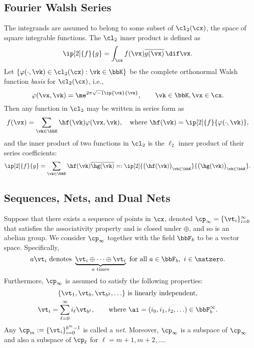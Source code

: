 \documentclass[]{elsarticle}
\theoremstyle{definition}
\begin{document}
\subsection{Fourier Walsh Series}

The integrands are assumed to belong to some subset of $\cl_2(\cx)$, the space of square integrable functions.  The $\cl_2$ inner product is defined as 
\[
\ip[2]{f}{g} = \int_{\cx} f(\vx) \overline{g(\vx)} \, \dif \vx.
\]
Let $\{\varphi(\cdot,\vk) \in \cl_2(\cx) : \vk \in \bbK\}$ be the complete orthonormal Walsh function \emph{basis} for $\cl_2(\cx)$, i.e., 
\[
\varphi(\vx,\vk)  = \me^{2 \pi \sqrt{-1} \ip{\vk}{\vx}}, \qquad \vk \in \bbK, \vx \in \cx.
\]
Then any function in $\cl_2$ may be written in series form as
\begin{equation} \label{Fourierdef}
f(\vx) = \sum_{\vk \in \bbK} \hf(\vk) \varphi(\vx,\vk), \quad \text{where } \hf(\vk) = \ip[2]{f}{\varphi(\cdot,\vk)},
\end{equation}
and the inner product of two functions in $\cl_2$ is the $\ell_2$ inner product of their series coefficients:
\[
\ip[2]{f}{g} = \sum_{\vk \in \bbK} \hf(\vk)\overline{\hg(\vk)} =: \ip[2]{\bigl(\hf(\vk)\bigr)_{\vk \in \bbK}}{\bigl ( \hg(\vk)\bigr )_{\vk \in \bbK}}.
\]

\subsection{Sequences, Nets, and Dual Nets}
Suppose that there exists a sequence of points in $\cx$, denoted $\cp_\infty =\{\vt_i\}_{i=0}^{\infty}$ that satisfies the associativity property and is closed under $\oplus$, and so is an abelian group.  We consider $\cp_\infty$ together with the field $\bbF_b$ to be a vector space.  Specifically,
\[
a \vt_i \text{ denotes } \underbrace{\vt_{i} \oplus \cdots \oplus \vt_{i}}_{a \text{ times}} \text{ for all } a \in \bbF_b, \ i  \in \natzero.
\]
Furthermore, $\cp_\infty$ is assumed to satisfy the following properties:
\begin{subequations} \label{cpinfvector}
\begin{gather}
\{\vt_1, \vt_b, \vt_{b^2}, \ldots\} \text{ is linearly independent}, \\
\vt_i = \sum_{\ell=0}^{\infty} i_\ell \vt_{b^\ell}, \qquad \text{where }\ai=(i_0, i_1, i_2, \ldots ) \in \bbF_b^\infty.
\end{gather}
\end{subequations}
Any $\cp_m := \{\vt_i\}_{i=0}^{b^m-1}$ is called a \emph{net}.  Moreover, $\cp_\infty$ is a subspace of $\cp_\infty$ and also a subspace of $\cp_\ell$ for $\ell=m+1, m+2, \ldots$.
\end{document}
